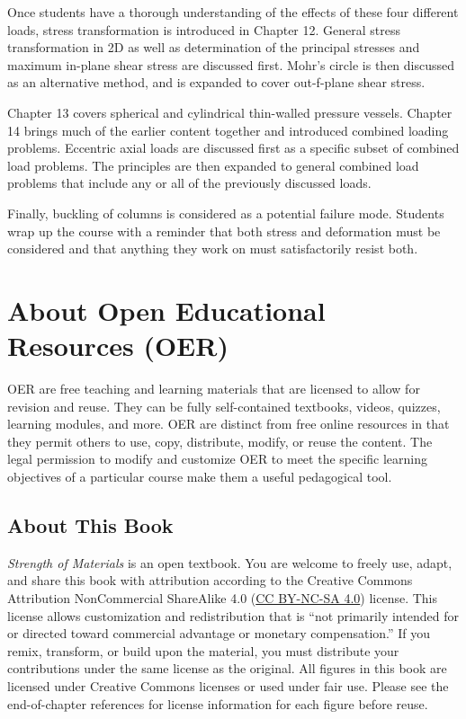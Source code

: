 \documentclass[
  letterpaper,
  DIV=11,
  numbers=noendperiod]{scrreprt}
\theoremstyle{definition}
\theoremstyle{remark}
\begin{document}
Once students have a thorough understanding of the effects of these four
different loads, stress transformation is introduced in Chapter 12.
General stress transformation in 2D as well as determination of the
principal stresses and maximum in-plane shear stress are discussed
first. Mohr's circle is then discussed as an alternative method, and is
expanded to cover out-f-plane shear stress.

Chapter 13 covers spherical and cylindrical thin-walled pressure
vessels. Chapter 14 brings much of the earlier content together and
introduced combined loading problems. Eccentric axial loads are
discussed first as a specific subset of combined load problems. The
principles are then expanded to general combined load problems that
include any or all of the previously discussed loads.

Finally, buckling of columns is considered as a potential failure mode.
Students wrap up the course with a reminder that both stress and
deformation must be considered and that anything they work on must
satisfactorily resist both.

\section*{\texorpdfstring{\textbf{About Open Educational Resources
(OER)}}{About Open Educational Resources (OER)}}\label{about-open-educational-resources-oer}


OER are free teaching and learning materials that are licensed to allow
for revision and reuse. They can be fully self-contained textbooks,
videos, quizzes, learning modules, and more. OER are distinct from free
online resources in that they permit others to use, copy, distribute,
modify, or reuse the content. The legal permission to modify and
customize OER to meet the specific learning objectives of a particular
course make them a useful pedagogical tool.

\subsection*{\texorpdfstring{\textbf{About This
Book}}{About This Book}}\label{about-this-book}

\emph{Strength of Materials} is an open textbook. You are welcome to
freely use, adapt, and share this book with attribution according to the
Creative Commons Attribution NonCommercial ShareAlike 4.0
(\href{https://creativecommons.org/licenses/by-nc-sa/4.0/deed.en}{CC
BY-NC-SA 4.0}) license. This license allows customization and
redistribution that is ``not primarily intended for or directed toward
commercial advantage or monetary compensation.'' If you remix,
transform, or build upon the material, you must distribute your
contributions under the same license as the original. All figures in
this book are licensed under Creative Commons licenses or used under
fair use. Please see the end-of-chapter references for license
information for each figure before reuse.
\end{document}
